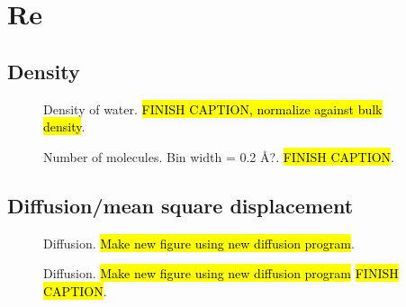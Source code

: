 \chapter{Re}
\section{Density}
\begin{figure}[htpb]%
    \centering%
    \caption{%
        Density of water. \hl{FINISH CAPTION, normalize against bulk density}. %
    }%
\end{figure}%
\begin{figure}[htpb]%
    \centering%
    \caption{%
        Number of molecules. Bin width = 0.2 \AA?. \hl{FINISH CAPTION}. %
    }%
\end{figure}%

\FloatBarrier
\section{Diffusion/mean square displacement}
\begin{figure}[htpb]%
    \centering%
    {
        \newcommand{\f}{\footnotesize}
    }
    \caption{%
        Diffusion. \hl{Make new figure using new diffusion program}. %
    }%
\end{figure}%

\begin{figure}[htpb]%
    \centering%
    {
        \newcommand{\f}{\footnotesize}%
    }
    \caption{%
        Diffusion. \hl{Make new figure using new diffusion program} \hl{FINISH CAPTION}. %
    }%
\end{figure}%

